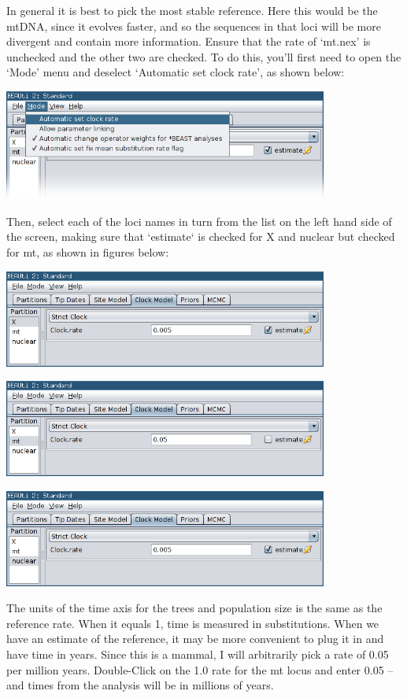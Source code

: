 \documentclass[a4paper,11pt]{article}
\begin{document}
In general it is best to pick the most stable reference. Here this would be the
mtDNA, since it evolves faster, and so the sequences in that loci will be more
divergent and contain more information. Ensure that the rate of `mt.nex' is
unchecked and the other two are checked. To do this, you'll first need to open
the `Mode' menu and deselect `Automatic set clock rate', as shown below:

\includegraphics[width=0.8\textwidth]{figures/clock_model.png}

Then, select each of the loci names in turn from the list on the left hand side
of the screen, making sure that `estimate` is checked for X and nuclear but
checked for mt, as shown in figures below:

\includegraphics[width=0.8\textwidth]{figures/clock_model2.png}

\includegraphics[width=0.8\textwidth]{figures/clock_model3.png}

\includegraphics[width=0.8\textwidth]{figures/clock_model4.png}

The units of the time axis for the trees and population size is the same as the
reference rate. When it equals 1, time is measured in substitutions. When we
have an estimate of the reference, it may be more convenient to plug it in and
have time in years. Since this is a mammal, I will arbitrarily pick a rate of
0.05 per million years. Double-Click on the 1.0 rate for the mt locus and enter
0.05 – and times from the analysis will be in millions of years.
\end{document}
